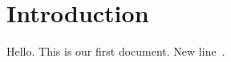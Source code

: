 \documentclass[11pt]{article}
\begin{document}
    \section{Introduction}\label{sec:introduction}

    Hello.
    This is our first document.
    New line~\cite{adams1995hitchhiker}.


    
    
\end{document}
